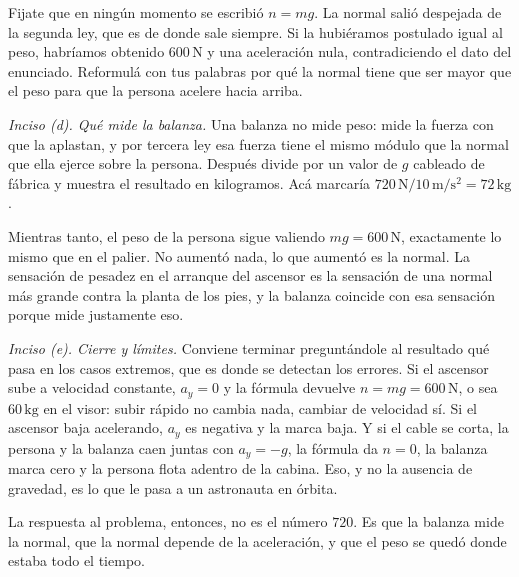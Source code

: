 \documentclass[11pt,openany]{book}
\begin{document}
\begin{ejemplo}[completo]
Fijate que en ningún momento se escribió $n = mg$. La normal salió despejada de la segunda ley, que es de donde sale siempre. Si la hubiéramos postulado igual al peso, habríamos obtenido $600\,\mathrm{N}$ y una aceleración nula, contradiciendo el dato del enunciado. Reformulá con tus palabras por qué la normal tiene que ser mayor que el peso para que la persona acelere hacia arriba.

\medskip
\textit{Inciso (d). Qué mide la balanza.} Una balanza no mide peso: mide la fuerza con que la aplastan, y por tercera ley esa fuerza tiene el mismo módulo que la normal que ella ejerce sobre la persona. Después divide por un valor de $g$ cableado de fábrica y muestra el resultado en kilogramos. Acá marcaría $720\,\mathrm{N} / 10\,\mathrm{m/s^2} = 72\,\mathrm{kg}$.

Mientras tanto, el peso de la persona sigue valiendo $mg = 600\,\mathrm{N}$, exactamente lo mismo que en el palier. No aumentó nada, lo que aumentó es la normal. La sensación de pesadez en el arranque del ascensor es la sensación de una normal más grande contra la planta de los pies, y la balanza coincide con esa sensación porque mide justamente eso.

\medskip
\textit{Inciso (e). Cierre y límites.} Conviene terminar preguntándole al resultado qué pasa en los casos extremos, que es donde se detectan los errores. Si el ascensor sube a velocidad constante, $a_y = 0$ y la fórmula devuelve $n = mg = 600\,\mathrm{N}$, o sea $60\,\mathrm{kg}$ en el visor: subir rápido no cambia nada, cambiar de velocidad sí. Si el ascensor baja acelerando, $a_y$ es negativa y la marca baja. Y si el cable se corta, la persona y la balanza caen juntas con $a_y = -g$, la fórmula da $n = 0$, la balanza marca cero y la persona flota adentro de la cabina. Eso, y no la ausencia de gravedad, es lo que le pasa a un astronauta en órbita.

La respuesta al problema, entonces, no es el número $720$. Es que la balanza mide la normal, que la normal depende de la aceleración, y que el peso se quedó donde estaba todo el tiempo.
\end{ejemplo}
\end{document}
